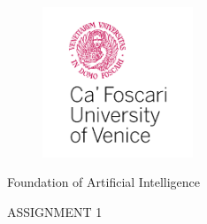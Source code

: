 \begin{titlepage}

\begin{figure}[h]
    \includegraphics[width=0.40\textwidth]{images/unive_logo_2.png}
\end{figure}

\begin{center}
    \vspace*{.08\textheight}
    {\textnormal{\LARGE {Foundation of Artificial Intelligence}}\par}
	\vspace{20mm}
	\fontsize{10mm}{8mm}\selectfont 
    \textup{ASSIGNMENT 1}
\end{center}

\vspace{.075\textheight}




\end{titlepage}